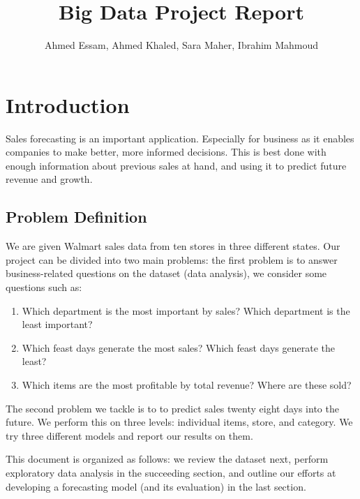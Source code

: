 \documentclass[12pt]{article}
\begin{document}
\title{Big Data Project Report}
\author{Ahmed Essam, Ahmed Khaled, Sara Maher, Ibrahim Mahmoud}

\maketitle


\tableofcontents
\clearpage
\setlength{\parindent}{0pt}
\setlength{\parskip}{\baselineskip}
\section{Introduction}
Sales forecasting is an important application. Especially for business as it enables companies to make better, more informed decisions. This is best done with enough information about previous sales at hand, and using it to predict future revenue and growth.

\subsection{Problem Definition}
We are given Walmart sales data from ten stores in three different states. Our project can be divided into two main problems: the first problem is to answer business-related questions on the dataset (data analysis), we consider some questions such as:
\begin{enumerate}
  \item Which department is the most important by sales? Which department is the least important?
  \item Which feast days generate the most sales? Which feast days generate the least?
  \item Which items are the most profitable by total revenue? Where are these sold?
\end{enumerate}
The second problem we tackle is to to predict sales twenty eight days into the future. We perform this on three levels: individual items, store, and category. We try three different models and report our results on them.

This document is organized as follows: we review the dataset next, perform exploratory data analysis in the succeeding section, and outline our efforts at developing a forecasting model (and its evaluation) in the last section.
\end{document}

